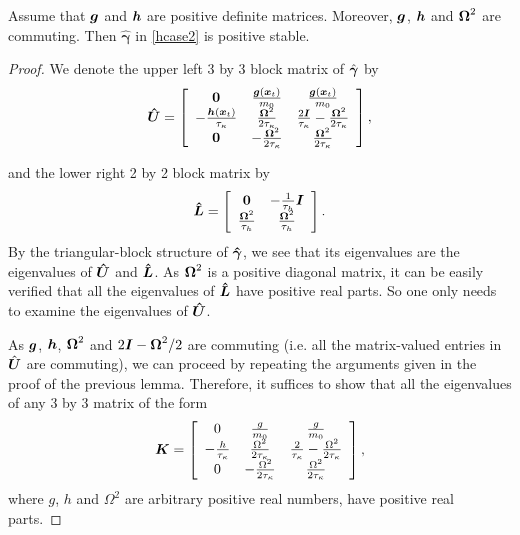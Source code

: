 \begin{lemma}  \label{linalg2}
Assume that $\boldsymbol{g}$ and $\boldsymbol{h}$ are positive definite matrices. Moreover, $\boldsymbol{g}$, $\boldsymbol{h}$ and $\boldsymbol{\Omega}^2$ are commuting. Then $\boldsymbol{\hat{\gamma}}$ in \eqref{hcase2} is positive stable.
\end{lemma}

\begin{proof}
 We denote the upper left 3 by 3 block matrix of $\hat{\boldsymbol{\gamma}}$ by \begin{equation}\boldsymbol{\hat{U}} = \left[ \begin{array}{ccc}
\boldsymbol{0}  & \frac{\boldsymbol{g}(\boldsymbol{x}_{t})}{m_{0}} & \frac{\boldsymbol{g}(\boldsymbol{x}_{t})}{m_{0}}  \\
-\frac{\boldsymbol{h}(\boldsymbol{x}_{t})}{\tau_{\kappa}} & \frac{\boldsymbol{\Omega}^2}{2 \tau_{\kappa}} & \frac{2 \boldsymbol{I}}{\tau_{\kappa}} - \frac{\boldsymbol{\Omega}^2}{2 \tau_{\kappa}}  \\ 
\boldsymbol{0}  & -\frac{\boldsymbol{\Omega}^2}{2 \tau_{\kappa}} & \frac{\boldsymbol{\Omega}^2}{2 \tau_{\kappa}}   \end{array} \right],\end{equation}

and the lower right 2 by 2 block matrix by 
\begin{equation} \boldsymbol{\hat{L}} = \left[ \begin{array}{cc}
 \boldsymbol{0}  & -\frac{1}{\tau_{h}} \boldsymbol{I} \\
 \frac{\boldsymbol{\Omega}^2}{\tau_{h}} & \frac{\boldsymbol{\Omega}^2}{\tau_{h}}   \end{array} \right].\end{equation} By the triangular-block structure of $\boldsymbol{\hat{\gamma}}$, we see that its eigenvalues are the eigenvalues of $\boldsymbol{\hat{U}}$ and $\boldsymbol{\hat{L}}$. As $\boldsymbol{\Omega}^2$ is a positive diagonal matrix, it can be easily verified that all the eigenvalues of $\boldsymbol{\hat{L}}$ have positive real parts. So one only needs to examine the eigenvalues of $\boldsymbol{\hat{U}}$. 

As $\boldsymbol{g}$, $\boldsymbol{h}$, $\boldsymbol{\Omega}^2$ and $2\boldsymbol{I}-\boldsymbol{\Omega}^2/2$ are commuting (i.e. all the matrix-valued entries in $\hat{\boldsymbol{U}}$ are commuting), we can proceed by repeating the arguments given in the proof of the previous lemma. Therefore, it suffices to show that all the eigenvalues of any $3$ by $3$ matrix of the form
 \begin{equation}\boldsymbol{K} = \left[ \begin{array}{ccc}
0  & \frac{g}{m_{0}} & \frac{g}{m_{0}}  \\
-\frac{h}{\tau_{\kappa}} & \frac{\Omega^2}{2 \tau_{\kappa}} & \frac{2}{\tau_{\kappa}} - \frac{\Omega^2}{2 \tau_{\kappa}}  \\ 
0  & -\frac{\Omega^2}{2 \tau_{\kappa}} & \frac{\Omega^2}{2 \tau_{\kappa}}   \end{array} \right], \end{equation} where $g$, $h$ and $\Omega^2$ are arbitrary positive real numbers, have positive real parts.


\end{proof}
